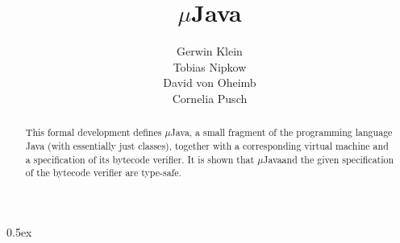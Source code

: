 \documentclass[11pt,a4paper]{article}
\newcommand{\mJava}{$\mu$Java}
\begin{document}
\title{\mJava}
\author{Gerwin Klein \\ Tobias Nipkow \\ David von Oheimb \\ Cornelia Pusch}
\maketitle

\begin{abstract}
  This formal development defines \mJava, a small fragment of the
  programming language Java (with essentially just classes), together with a
  corresponding virtual machine and a specification of its bytecode verifier.
  It is shown that \mJava and the given specification of the bytecode
  verifier are type-safe.
\end{abstract}

\tableofcontents
\parindent 0pt \parskip 0.5ex

\newpage


\nocite{*}


\end{document}
